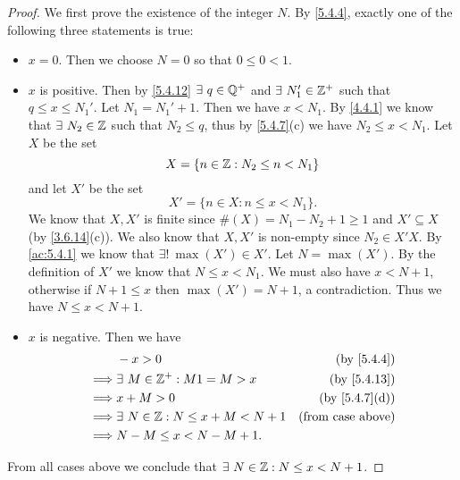 \begin{proof}
  We first prove the existence of the integer \(N\).
  By \cref{5.4.4}, exactly one of the following three statements is true:
  \begin{itemize}
    \item \(x = 0\).
          Then we choose \(N = 0\) so that \(0 \leq 0 < 1\).
    \item \(x\) is positive.
          Then by \cref{5.4.12} \(\exists\ q \in \Q^+\) and \(\exists\ N_1' \in \mathbb{Z}^+\) such that \(q \leq x \leq N_1'\).
          Let \(N_1 = N_1' + 1\).
          Then we have \(x < N_1\).
          By \cref{4.4.1} we know that \(\exists\ N_2 \in \mathbb{Z}\) such that \(N_2 \leq q\), thus by \cref{5.4.7}(c) we have \(N_2 \leq x < N_1\).
          Let \(X\) be the set
          \[
            X = \{n \in \mathbb{Z} : N_2 \leq n < N_1\}
          \]
          and let \(X'\) be the set
          \[
            X' = \{n \in X : n \leq x < N_1\}.
          \]
          We know that \(X, X'\) is finite since \(\#(X) = N_1 - N_2 + 1 \geq 1\) and \(X' \subseteq X\) (by \cref{3.6.14}(c)).
          We also know that \(X, X'\) is non-empty since \(N_2 \in X'X\).
          By \cref{ac:5.4.1} we know that \(\exists!\ \max(X') \in X'\).
          Let \(N = \max(X')\).
          By the definition of \(X'\) we know that \(N \leq x < N_1\).
          We must also have \(x < N + 1\), otherwise if \(N + 1 \leq x\) then \(\max(X') = N + 1\), a contradiction.
          Thus we have \(N \leq x < N + 1\).
    \item \(x\) is negative.
          Then we have
          \begin{align*}
                     & -x > 0                                   & \text{(by \cref{5.4.4})}    \\
            \implies & \exists\ M \in \Z^+ : M1 = M > x         & \text{(by \cref{5.4.13})}   \\
            \implies & x + M > 0                                & \text{(by \cref{5.4.7}(d))} \\
            \implies & \exists\ N \in \Z : N \leq x + M < N + 1 & \text{(from case above)}    \\
            \implies & N - M \leq x < N - M + 1.
          \end{align*}
  \end{itemize}
  From all cases above we conclude that \(\exists\ N \in \mathbb{Z} : N \leq x < N + 1\).


\end{proof}
